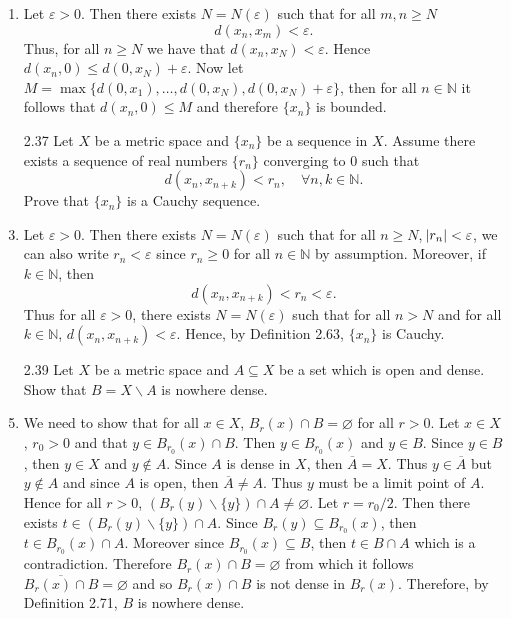 \documentclass[12pt]{article}
\makeatletter
\theoremstyle{definition}
\theoremstyle{remark}
\renewenvironment{proof}[1][\proofname]{\par
  \pushQED{\qed}%
  \normalfont \topsep6\p@\@plus6\p@\relax
  \list{}{\leftmargin=0mm
          \rightmargin=4mm
          \settowidth{\itemindent}{\itshape#1}%
          \labelwidth=\itemindent
          \parsep=0pt \listparindent=\parindent 
  }
  \item[\hskip\labelsep
        \itshape
    #1\@addpunct{.}]\ignorespaces
}{%
  \popQED\endlist\@endpefalse
}
\let\oldproofname=\proofname
\renewcommand{\proofname}{\bf{\textit{\oldproofname}}}
\makeatother
\begin{document}
\begin{enumerate}[leftmargin=*]
\begin{proof}
                    Let $\varepsilon>0$. Then there exists $N=N(\varepsilon)$ such that for all $m,n\geq N$
                        \begin{equation*}
                            d(x_n,x_m)<\varepsilon.
                        \end{equation*}
                    Thus, for all $n\geq N$ we have that $d(x_n,x_N)<\varepsilon$. Hence $d(x_n,0)\leq d(0,x_N)+\varepsilon$. Now let $M=\max\{d(0,x_1),\dots,d(0,x_N),d(0,x_N)+\varepsilon\}$, then for all $n\in\mathbb{N}$ it follows that $d(x_n,0)\leq M$ and therefore $\{x_n\}$ is bounded.
                \end{proof}
            \item[2.37] Let $X$ be a metric space and $\{x_n\}$ be a sequence in $X$. Assume there exists a sequence of real numbers $\{r_n\}$ converging to 0 such that 
                \begin{equation*}
                    d(x_n,x_{n+k})<r_n,\quad\forall n,k\in\mathbb{N}.
                \end{equation*}
            Prove that $\{x_n\}$ is a Cauchy sequence.
                \begin{proof}
                    Let $\varepsilon>0$. Then there exists $N=N(\varepsilon)$ such that for all $n\geq N$, $\abs{r_n}<\varepsilon$, we can also write $r_n<\varepsilon$ since $r_n\geq 0$ for all $n\in\mathbb{N}$ by assumption. Moreover, if $k\in\mathbb{N}$, then 
                        \begin{equation*}
                            d(x_n,x_{n+k})<r_n<\varepsilon.
                        \end{equation*}
                    Thus for all $\varepsilon>0$, there exists $N=N(\varepsilon)$ such that for all $n> N$ and for all $k\in\mathbb{N}$, $d(x_n,x_{n+k})<\varepsilon$. Hence, by Definition 2.63, $\{x_n\}$ is Cauchy.
                \end{proof}\newpage
            \item[2.39] Let $X$ be a metric space and $A\subseteq X$ be a set which is open and dense. Show that $B=X\backslash A$ is nowhere dense.
                \begin{proof}
                    We need to show that for all $x\in X$, $B_r(x)\cap B=\varnothing$ for all $r>0$. Let $x\in X$, $r_0>0$ and that $y\in B_{r_0}(x)\cap B$. Then $y\in B_{r_0}(x)$ and $y\in B$. Since $y\in B$, then $y\in X$ and $y\notin A$. Since $A$ is dense in $X$, then $\overline{A}=X$. Thus $y\in\overline{A}$ but $y\notin A$ and since $A$ is open, then $\overline{A}\neq A$. Thus $y$ must be a limit point of $A$. Hence for all $r>0$, $(B_r(y)\backslash\{y\})\cap A\neq\varnothing$. Let $r=r_0/2$. Then there exists $t\in(B_r(y)\backslash\{y\})\cap A$. Since $B_r(y)\subseteq B_{r_0}(x)$, then $t\in B_{r_0}(x)\cap A$. Moreover since $B_{r_0}(x)\subseteq B$, then $t\in B\cap A$ which is a contradiction. Therefore $B_r(x)\cap B=\varnothing$ from which it follows $\overline{B_r(x)\cap B}=\varnothing$ and so $B_r(x)\cap B$ is not dense in $B_r(x)$. Therefore, by Definition 2.71, $B$ is nowhere dense.

\end{proof}
\end{enumerate}
\end{document}
